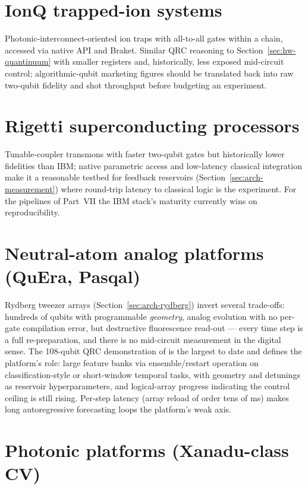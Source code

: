 \section{IonQ trapped-ion systems}
\label{sec:hw-ionq}

Photonic-interconnect-oriented ion traps with all-to-all gates within a
chain, accessed via native API and Braket. Similar QRC reasoning to
Section~\ref{sec:hw-quantinuum} with smaller registers and, historically,
less exposed mid-circuit control; algorithmic-qubit marketing figures should
be translated back into raw two-qubit fidelity and shot throughput before
budgeting an experiment.

\section{Rigetti superconducting processors}
\label{sec:hw-rigetti}

Tunable-coupler transmons with faster two-qubit gates but historically lower
fidelities than IBM; native parametric access and low-latency classical
integration make it a reasonable testbed for feedback reservoirs
(Section~\ref{sec:arch-measurement}) where round-trip latency to classical
logic is the experiment. For the pipelines of Part~VII the IBM stack's
maturity currently wins on reproducibility.

\section{Neutral-atom analog platforms (QuEra, Pasqal)}
\label{sec:hw-neutral}

Rydberg tweezer arrays (Section~\ref{sec:arch-rydberg}) invert several
trade-offs: hundreds of qubits with programmable \emph{geometry}, analog
evolution with no per-gate compilation error, but destructive fluorescence
read-out --- every time step is a full re-preparation, and there is no
mid-circuit measurement in the digital sense. The 108-qubit QRC demonstration
of \citet{kornjaca2024large} is the largest to date and defines the
platform's role: large feature banks via ensemble/restart operation on
classification-style or short-window temporal tasks, with geometry and
detunings as reservoir hyperparameters, and logical-array progress
\citep{bluvstein2024logical} indicating the control ceiling is still rising.
Per-step latency (array reload of order tens of ms) makes long
autoregressive forecasting loops the platform's weak axis.

\section{Photonic platforms (Xanadu-class CV)}
\label{sec:hw-photonic}

